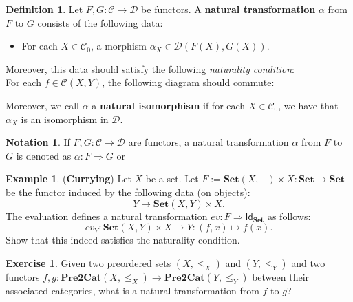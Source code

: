 \documentclass[a4paper,11pt, oneside,titlepage=false]{scrbook}
\theoremstyle{plain}
\theoremstyle{definition}
\newtheorem{dfn}[thm]{Definition}
\newtheorem{exa}[thm]{Example}
\newtheorem{exer}[thm]{Exercise}
\newtheorem{nota}[thm]{Notation}
\newcommand{\cfont}[1]{\ensuremath{\mathsf{#1}}}
\newcommand{\Cat}[1]{\mathcal{#1}}
\newcommand{\CC}{\Cat{C}}
\newcommand{\DD}{\Cat{D}}
\newcommand{\Catb}[1]{\mathbf{#1}}
\newcommand{\SET}{\Catb{Set}}
\newcommand{\PREtoCAT}{\Catb{Pre2Cat}}
\newcommand{\Ob}[1]{{#1}_0}
\newcommand{\CHom}[3]{{#1}(#2,#3)}
\newcommand{\Id}[1][]{\cfont{Id}_{#1}}
\newcommand{\NatTrans}[3]{#1 : #2 \Rightarrow #3}
\begin{document}
\begin{dfn} Let $F,G: \CC\to\DD$ be functors. A \textbf{natural transformation} $\alpha$ from $F$ to $G$ consists of the following data:
\begin{itemize}
\item For each $X\in \Ob{\CC}$, a morphism $\alpha_X \in \CHom{\DD}{F(X)}{G(X)}$.
\end{itemize}
Moreover, this data should satisfy the following \textit{naturality condition}:\\
For each $f\in \CHom{\CC}{X}{Y}$, the following diagram should commute:
\begin{center}
\end{center}
Moreover, we call $\alpha$ a \textbf{natural isomorphism} if for each $X\in\Ob{\CC}$, we have that $\alpha_X$ is an isomorphism in $\DD$.
\end{dfn}

\begin{nota} If $F,G:\CC\to\DD$ are functors, a natural transformation $\alpha$ from $F$ to $G$ is denoted as $\NatTrans{\alpha}{F}{G}$ or 
\begin{center}
\end{center}
\end{nota}

\begin{exa} (\textbf{Currying}) Let $X$ be a set. Let $F := \SET(X, -)\times X : \SET\to\SET$ be the functor induced by the following data (on objects):
\[
Y\mapsto \SET(X,Y)\times X.
\]
The evaluation defines a natural transformation $\NatTrans{ev}{F}{\Id[\SET]}$ as follows:
\[
ev_Y : \SET(X,Y) \times X \to Y : (f,x) \mapsto f(x).
\]
Show that this indeed satisfies the naturality condition.
\end{exa}

\begin{exer}
  Given two preordered sets $(X,\leq_X)$ and $(Y, \leq_Y)$ and two functors $f, g : \PREtoCAT(X,\leq_X) \to \PREtoCAT(Y,\leq_Y)$ between their associated categories, what is a natural transformation from $f$ to $g$?
\end{exer}
\end{document}
